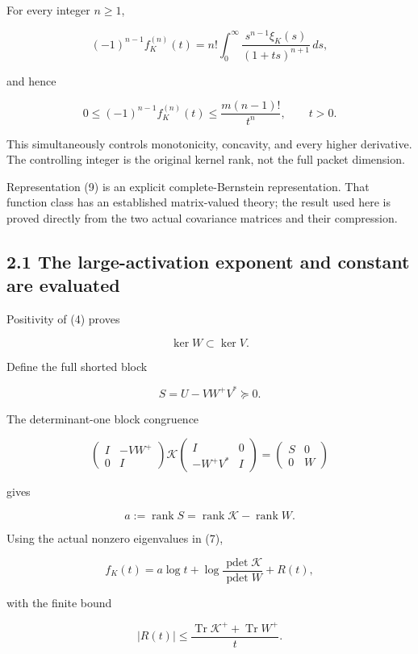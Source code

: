 For every integer \(n\ge1\),

\[
\boxed{
(-1)^{n-1}f_K^{(n)}(t)
=
n!\int_0^\infty
\frac{s^{n-1}\xi_K(s)}{(1+ts)^{n+1}}\,ds,
}
\]

and hence

\[
\boxed{
0\le(-1)^{n-1}f_K^{(n)}(t)
\le \frac{m(n-1)!}{t^n},
\qquad t>0.
}
\tag{10}
\]

This simultaneously controls monotonicity, concavity, and every higher derivative. The controlling integer is the original kernel rank, not the full packet dimension.

Representation (9) is an explicit complete-Bernstein representation. That function class has an established matrix-valued theory; the result used here is proved directly from the two actual covariance matrices and their compression.

\subsection{2.1 The large-activation exponent and constant are evaluated}\label{the-large-activation-exponent-and-constant-are-evaluated}

Positivity of (4) proves

\[
\ker W\subset\ker V.
\]

Define the full shorted block

\[
S=U-VW^+V^*\succeq0.
\tag{11}
\]

The determinant-one block congruence

\[
\begin{pmatrix}I&-VW^+\\0&I\end{pmatrix}
\mathcal K
\begin{pmatrix}I&0\\-W^+V^*&I\end{pmatrix}
=
\begin{pmatrix}S&0\\0&W\end{pmatrix}
\]

gives

\[
a:=\operatorname{rank}S
=\operatorname{rank}\mathcal K-\operatorname{rank}W.
\]

Using the actual nonzero eigenvalues in (7),

\[
\boxed{
f_K(t)
=
a\log t+
\log\frac{\operatorname{pdet}\mathcal K}
{\operatorname{pdet}W}
+R(t),
}
\tag{12}
\]

with the finite bound

\[
\boxed{
|R(t)|
\le
\frac{\operatorname{Tr}\mathcal K^+
+\operatorname{Tr}W^+}{t}.
}
\tag{13}
\]

